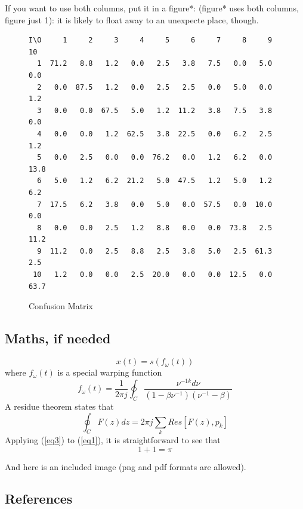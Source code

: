 \documentclass[10pt,a4paper,oneclumn]{article}
\begin{document}
If you want to use both columns, put it in a figure*:
(figure* uses both columns, figure just 1):
it is likely to float away to an unexpecte place, though.
\begin{figure}[h]
  \centering
{\small
\begin{verbatim}
I\O     1     2     3     4     5     6     7     8     9    10
  1  71.2   8.8   1.2   0.0   2.5   3.8   7.5   0.0   5.0   0.0
  2   0.0  87.5   1.2   0.0   2.5   2.5   0.0   5.0   0.0   1.2
  3   0.0   0.0  67.5   5.0   1.2  11.2   3.8   7.5   3.8   0.0
  4   0.0   0.0   1.2  62.5   3.8  22.5   0.0   6.2   2.5   1.2
  5   0.0   2.5   0.0   0.0  76.2   0.0   1.2   6.2   0.0  13.8
  6   5.0   1.2   6.2  21.2   5.0  47.5   1.2   5.0   1.2   6.2
  7  17.5   6.2   3.8   0.0   5.0   0.0  57.5   0.0  10.0   0.0
  8   0.0   0.0   2.5   1.2   8.8   0.0   0.0  73.8   2.5  11.2
  9  11.2   0.0   2.5   8.8   2.5   3.8   5.0   2.5  61.3   2.5
 10   1.2   0.0   0.0   2.5  20.0   0.0   0.0  12.5   0.0  63.7
\end{verbatim}
}

  \caption{Confusion Matrix}
  
\end{figure}

\subsection{Maths, if needed}

%
\begin{equation}
x(t) = s(f_\omega(t))
\label{eq1}
\end{equation}
where \(f_\omega(t)\) is a special warping function
\begin{equation}
f_\omega(t)=\frac{1}{2\pi j}\oint_C \frac{\nu^{-1k}d\nu}
{(1-\beta\nu^{-1})(\nu^{-1}-\beta)}
\label{eq2}
\end{equation}
A residue theorem states that
\begin{equation}
\oint_C F(z)dz=2 \pi j \sum_k Res[F(z),p_k]
\label{eq3}
\end{equation}
Applying (\ref{eq3}) to (\ref{eq1}), 
it is straightforward to see that
\begin{equation}
1 + 1 = \pi
\label{eq4}
\end{equation}

And here is an included image (png and pdf formats are allowed).

\subsection{References}
\end{document}
